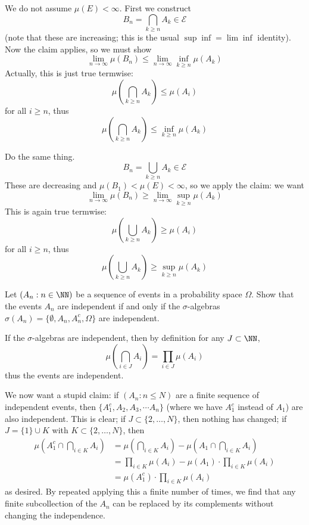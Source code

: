 \documentclass[11pt, headheight=30pt]{scrartcl}
\begin{document}
    
\begin{psec*}
    We do not assume $\mu(E) < \infty$. First we construct
    \[
        B_n =  \bigcap_{k\geq n} A_k \in \mathcal{E}   
    \]
    (note that these are increasing; this is the usual $\sup \inf = \lim \inf$
    identity).
    Now the claim applies, so we must show
    \[
        \lim_{n\to \infty} \mu\left(B_n\right) \leq \lim_{n\to \infty} \inf_{k\geq n} \mu(A_k)    
    \]
    Actually, this is just true termwise:
    \[
        \mu\left(\bigcap_{k\geq n} A_k\right) \leq \mu\left(A_i\right)
    \]
    for all $i \geq n$, thus
    \[
        \mu\left(\bigcap_{k\geq n} A_k\right) \leq \inf_{k\geq n} \mu(A_k)
    \]
\end{psec*}


\begin{psec*}
    Do the same thing.
    \[
        B_n =  \bigcup_{k\geq n} A_k \in \mathcal{E}   
    \]
    These are decreasing and $\mu(B_1) < \mu(E) < \infty$,
    so we apply the claim: we want
    \[
        \lim_{n\to \infty} \mu\left(B_n\right) \geq \lim_{n\to \infty} \sup_{k\geq n} \mu(A_k)    
    \]
    This is again true termwise:
    \[
        \mu\left(\bigcup_{k\geq n} A_k\right) \geq \mu\left(A_i\right)
    \]
    for all $i \geq n$, thus
    \[
        \mu\left(\bigcup_{k\geq n} A_k\right) \geq \sup_{k\geq n} \mu(A_k)
    \]
\end{psec*}

\pagebreak
\begin{prob*}
    Let $(A_n : n \in \NN)$ be a sequence of events in a
    probability space $\Omega$. Show that the events $A_n$
    are independent if and only if the $\sigma$-algebras
    $\sigma(A_n) = \{\emptyset, A_n, A_n^c, \Omega\}$ are independent.
\end{prob*}

If the $\sigma$-algebras
are independent, then by definition for any $J\subset \NN$,
\[
    \mu\left(\bigcap_{i\in J} A_i\right) = \prod_{i\in J} \mu(A_i)
\]
thus the events are independent.

We now want a stupid claim: if $(A_n : n\leq N)$ are a finite
sequence of independent events, then $\{A_1^c, A_2, A_3,\cdots A_n\}$
(where we have $A_1^c$ instead of $A_1$) are also independent. This is
clear; if $J \subset \{2,\dots, N\}$, then nothing has changed;
if $J = \{1\}\cup K$ with $K\subset \{2,\dots, N\}$, then
\begin{align*}
    \mu\left(A_1^c\cap \bigcap_{i\in K} A_i\right) &= \mu\left(\bigcap_{i\in K} A_i\right) - \mu\left(A_1\cap \bigcap_{i\in K} A_i\right)\\
    &= \prod_{i\in K} \mu(A_i) - \mu(A_1)\cdot \prod_{i\in K} \mu(A_i)\\
    &= \mu(A_1^c)\cdot \prod_{i\in K} \mu(A_i)    
\end{align*}
as desired. By repeated applying this a finite number of
times, we find that any finite subcollection of the $A_n$
can be replaced by its complements without changing
the independence.
\end{document}
